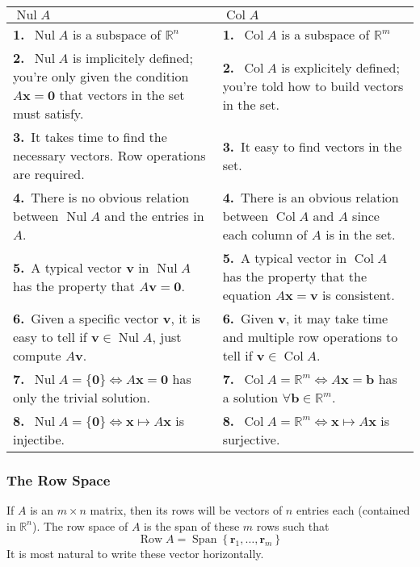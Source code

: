 \documentclass{article}
\numberwithin{equation}{section}
\theoremstyle{definition}
\newcommand{\V}{\mathbf{v}}
\newcommand{\R}{\mathbb{R}}
\DeclareMathOperator{\nul}{Nul}
\DeclareMathOperator{\spa}{Span}
\DeclareMathOperator{\row}{Row}
\DeclareMathOperator{\col}{Col}
\let\oldforall\forall
\renewcommand{\forall}{\mathrel{\oldforall}}
\newcommand{\x}{\times}
\theoremstyle{adefn}
\begin{document}
	\begin{tabular}{|p{5cm} p{5cm}|}
		\hline
		$\nul A$ & $\col A$ \\ 
		\hline
		\textbf{1.}\ $\nul A$ is a subspace of $\R^n$ & \textbf{1.}\ $\col A$ is a subspace of $\R^m$ \\ 
		\textbf{2.}\ $\nul A$ is implicitely defined; you're only given the condition $A\textbf{x} = \textbf{0}$ that vectors in the set must satisfy. & \textbf{2.}\ $\col A$ is explicitely defined; you're told how to build vectors in the set. \\
		\textbf{3.}\ It takes time to find the necessary vectors. Row operations are required. & \textbf{3.}\ It easy to find vectors in the set. \\ 
		\textbf{4.}\ There is no obvious relation between $\nul A$ and the entries in $A$. & \textbf{4.}\ There is an obvious relation between $\col A$ and $A$ since each column of $A$ is in the set. \\
		\textbf{5.}\ A typical vector $\V$ in $\nul A$ has the property that $A\V = \textbf{0}.$ & \textbf{5.}\ A typical vector in $\col A$ has the property that the equation $A\textbf{x} = \textbf{v}$ is consistent. \\ 
		\textbf{6.}\ Given a specific vector $\V$, it is easy to tell if $\V \in \nul A$, just compute $A\V$. & \textbf{6.}\ Given $\V$, it may take time and multiple row operations to tell if $\V \in \col A$. \\ 
		\textbf{7.}\ $\nul A = \{\textbf{0}\} \iff A\textbf{x}=\textbf{0}$ has only the trivial solution. & \textbf{7.}\ $\col A = \R^m \iff A\textbf{x} = \textbf{b}$ has a solution $\forall \textbf{b} \in \R^m$. \\
		\textbf{8.}\ $\nul A = \{\textbf{0}\} \iff \textbf{x} \mapsto A\textbf{x}$ is injectibe. & \textbf{8.}\ $\col A = \R^m \iff \textbf{x} \mapsto A\textbf{x}$ is surjective. \\
		\hline
	\end{tabular}
	\subsubsection{The Row Space}
	If $A$ is an $m \x n$ matrix, then its rows will be vectors of $n$ entries each (contained in $\R^n$). The row space of $A$ is the span of these $m$ rows such that 
	$$\row A = \spa \left\{ \textbf{r}_1, \ldots, \textbf{r}_m \right\}$$
	It is most natural to write these vector horizontally. 
\end{document}
